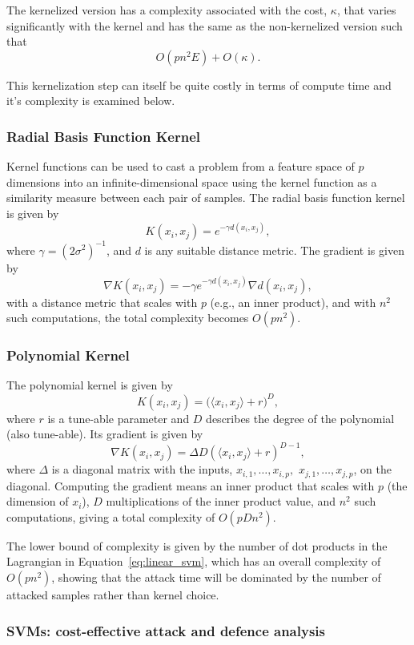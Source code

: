 \documentclass[runningheads]{llncs}
\begin{document}
The kernelized version has a complexity associated with the cost, $\kappa$, that varies significantly with the kernel and has the same  as the non-kernelized version such that
$$
    O(pn^2 E) + O(\kappa).
$$

This kernelization step can itself be quite costly in terms of compute time and it's complexity is examined below.

\subsubsection{Radial Basis Function Kernel}

Kernel functions can be used to cast a problem from a feature space of $p$ dimensions into an infinite-dimensional space using the kernel function as a similarity measure between each pair of samples. The radial basis function kernel is given by
$$
    K(x_i, x_j) = e^{-\gamma d(x_i, x_j)},
$$
where $\gamma = (2 \sigma^2)^{-1}$, and $d$ is any suitable distance metric. The gradient is given by 
$$
    \nabla K(x_i, x_j) = - \gamma e^{-\gamma d( x_i, x_j )} \nabla d(x_i, x_j),
$$
with a distance metric that scales with $p$ (e.g., an inner product), and with $n^2$ such computations, the total complexity becomes $O(pn^2)$.

\subsubsection{Polynomial Kernel}

The polynomial kernel is given by
$$
    K(x_i, x_j) = \big(\langle x_i, x_j \rangle + r \big)^D,
$$
where $r$ is a tune-able parameter and $D$ describes the degree of the polynomial (also tune-able). Its gradient is given by
$$
    \nabla K(x_i, x_j) = \Delta D(\langle x_i, x_j \rangle + r)^{D-1},
$$
where $\Delta$ is a diagonal matrix with the inputs, $x_{i,1},\ldots,x_{i,p},$ $x_{j,1},\ldots,x_{j,p}$, on the diagonal. Computing the gradient means an inner product that scales with $p$ (the dimension of $x_i$), $D$ multiplications of the inner product value, and $n^2$ such computations, giving a total complexity of $O(pDn^2)$.

The lower bound of complexity is given by the number of dot products in the Lagrangian in Equation~\ref{eq:linear_svm}, which has an overall complexity of $O(pn^2)$, showing that the attack time will be dominated by the number of attacked samples rather than kernel choice.


\subsubsection{SVMs: cost-effective attack and defence analysis}
\label{model}
\end{document}
